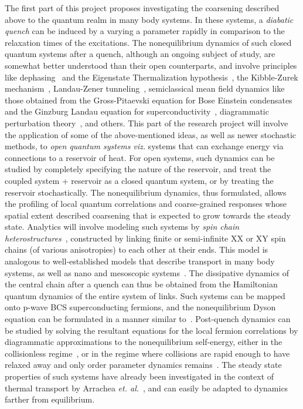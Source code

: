 \documentclass[a4paper,9pt]{article}
\begin{document}
The first part of this project proposes investigating the coarsening described above to the quantum realm in many body systems. 
In these systems, a \textit{diabatic quench} can be induced  by a varying a {parameter}  rapidly in comparison to the relaxation times of the excitations. The nonequilibrium dynamics of such closed quantum systems after a quench, although an ongoing subject of study,  {are somewhat better understood than their open counterparts}, and involve principles like dephasing~\cite{thermalization} and the Eigenstate Thermalization hypothesis~\cite{thermalization,krishrev}, the Kibble-Zurek mechanism~\cite{bikashbabu}, Landau-Zener tunneling~\cite{bikashbabu}, semiclassical mean field dynamics like those obtained from the Gross-Pitaevski equation for Bose Einstein condensates~\cite{colrev} and the Ginzburg Landau equation for superconductivity~\cite{rammer}, diagrammatic perturbation theory~\cite{gorkov, volkov}, and others. This part of the research project will involve the application of some of the above-mentioned ideas, as well as newer stochastic methods, to \textit{open quantum systems} \textit{viz.} systems 
that can exchange energy via connections to a reservoir of heat. For open systems, such dynamics can be studied by completely specifying the nature of the reservoir, and treat the coupled system + reservoir as a closed quantum system, or by treating the reservoir stochastically. The nonequilibrium dynamics, thus formulated, allows the profiling of local quantum correlations and coarse-grained responses whose spatial extent described coarsening that is expected to grow towards the steady state. Analytics will involve modeling such systems by \textit{spin chain heterostructures}~\cite{arrachea},  constructed by linking finite or semi-infinite XX or XY spin chains (of various anisotropies) to each other at their ends. This model is analogous to well-established models that describe transport in many body systems, as well as nano and mesoscopic systems~\cite{arrachea,openspin, imry}. The dissipative dynamics of the central chain after a quench can thus be obtained from the Hamiltonian quantum dynamics of the 
entire system of links. Such systems can be mapped onto p-wave BCS superconducting fermions, and the nonequilibrium Dyson equation can be formulated in a manner similar to~\cite{gorkov, volkov}. Post-quench dynamics can be studied by solving the resultant equations for the local fermion correlations by diagrammatic approximations to the nonequilibrium self-energy, either in the collisionless regime~\cite{volkov,ncnsd2012}, or in the regime where collisions are rapid enough to have relaxed away and only order parameter dynamics remains~\cite{ncnsd2012}. The steady state properties of such systems have already been investigated in the context of thermal transport by Arrachea \textit{et. al.}~\cite{arrachea}, and can easily be adapted to dynamics farther from equilibrium.
\end{document}
